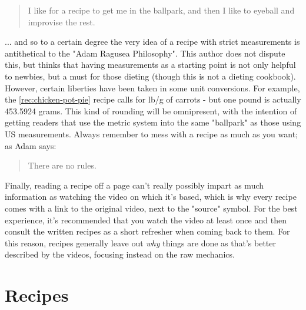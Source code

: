 \documentclass{book}
\begin{document}
\begin{quote}
I like for a recipe to get me in the ballpark, and then I like to eyeball and
improvise the rest.
\end{quote}

... and so to a certain degree the very idea of a recipe with strict
measurements is antithetical to the "Adam Ragusea Philosophy". This author does
not dispute this, but thinks that having measurements as a starting point is not
only helpful to newbies, but a must for those dieting (though this is not a
dieting cookbook). However, certain liberties have been taken in some unit
conversions. For example, the \ref{rec:chicken-pot-pie} recipe calls for
\unit[1]{lb}/\unit[450]{g} of carrots - but one pound is actually 453.5924
grams. This kind of rounding will be omnipresent, with the intention of getting
readers that use the metric system into the same "ballpark" as those using US
measurements. Always remember to mess with a recipe as much as you want; as Adam
says:

\begin{quote}
There are no rules.
\end{quote}

Finally, reading a recipe off a page can't really possibly impart as much
information as watching the video on which it's based, which is why every recipe
comes with a link to the original video, next to the "source" symbol. For the
best experience, it's recommended that you watch the video at least once and
then consult the written recipes as a short refresher when coming back to them.
For this reason, recipes generally leave out \emph{why} things are done as
that's better described by the videos, focusing instead on the raw mechanics.

\chapter{Recipes}
\end{document}
